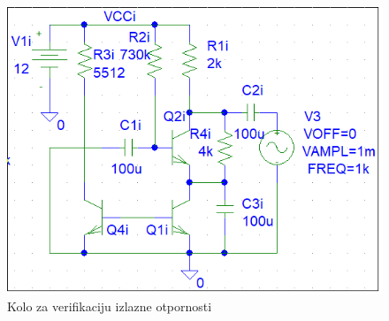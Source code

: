 \documentclass{article}
\begin{document}
            \begin{figure}
                \centering
                \includegraphics{CetvrtiKolo.png}
                \caption{Kolo za verifikaciju izlazne otpornosti}
                \label{CetvrtiKolo}
            \end{figure}
\end{document}
